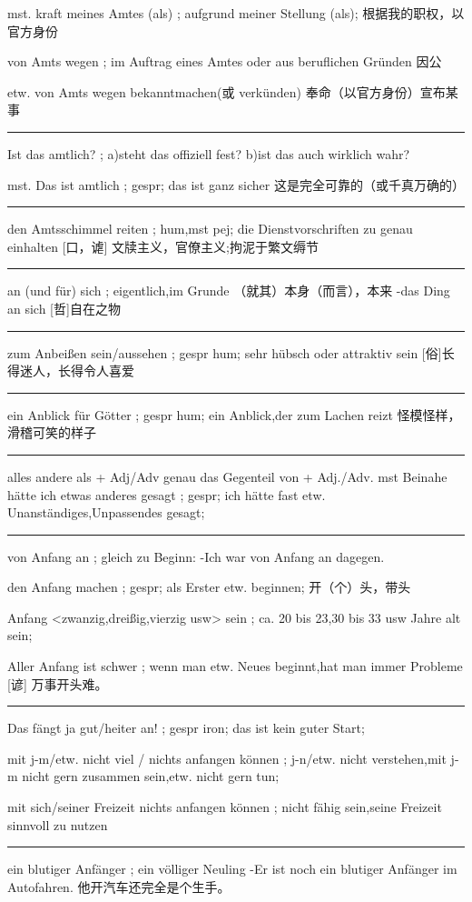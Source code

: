 mst. kraft meines Amtes (als) ; aufgrund meiner Stellung (als);
根据我的职权，以官方身份

von Amts wegen ; im Auftrag eines Amtes oder aus beruflichen Gründen 
因公

etw. von Amts wegen bekanntmachen(或 verkünden)
奉命（以官方身份）宣布某事

\noindent\rule{\textwidth}{1pt}  
Ist das amtlich? ; a)steht das offiziell fest? b)ist das auch wirklich wahr?

mst. Das ist amtlich ; gespr; das ist ganz sicher
这是完全可靠的（或千真万确的）

\noindent\rule{\textwidth}{1pt} 
den Amtsschimmel reiten ; hum,mst pej; die Dienstvorschriften zu genau einhalten
[口，谑] 文牍主义，官僚主义;拘泥于繁文缛节

\noindent\rule{\textwidth}{1pt}  
an (und für) sich ; eigentlich,im Grunde
（就其）本身（而言），本来
-das Ding an sich 
[哲]自在之物

\noindent\rule{\textwidth}{1pt}  
zum Anbeißen sein/aussehen ; gespr hum; sehr hübsch oder attraktiv sein
[俗]长得迷人，长得令人喜爱

\noindent\rule{\textwidth}{1pt}  
ein Anblick für Götter ; gespr hum; ein Anblick,der zum Lachen reizt
怪模怪样，滑稽可笑的样子

\noindent\rule{\textwidth}{1pt}  
alles andere als + Adj/Adv genau das Gegenteil von + Adj./Adv.
mst Beinahe hätte ich etwas anderes gesagt ; gespr; ich hätte fast etw. Unanständiges,Unpassendes gesagt;

\noindent\rule{\textwidth}{1pt}  
von Anfang an ; gleich zu Beginn: -Ich war von Anfang an dagegen.

den Anfang machen ; gespr; als Erster etw. beginnen;
开（个）头，带头

Anfang <zwanzig,dreißig,vierzig usw> sein ; ca. 20 bis 23,30 bis 33 usw Jahre alt sein;


Aller Anfang ist schwer ; wenn man etw. Neues beginnt,hat man immer Probleme
[谚] 万事开头难。

\noindent\rule{\textwidth}{1pt}  
Das fängt ja gut/heiter an! ; gespr iron; das ist kein guter Start;

mit j-m/etw. nicht viel / nichts anfangen können ; j-n/etw. nicht verstehen,mit j-m nicht gern zusammen sein,etw. nicht gern tun;

mit sich/seiner Freizeit nichts anfangen können ; nicht fähig sein,seine Freizeit sinnvoll zu nutzen

\noindent\rule{\textwidth}{1pt}  
ein blutiger Anfänger ; ein völliger Neuling
-Er ist noch ein blutiger Anfänger im Autofahren.
他开汽车还完全是个生手。

